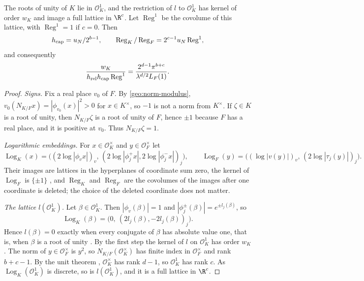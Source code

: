\begin{proposition}\label{geo:mass}
The roots of unity of $K$ lie in $\mathcal O_K^1$, and the restriction of
$l$ to $\mathcal O_K^1$ has kernel of order $w_K$ and image a full
lattice in $\R^c$. Let $\operatorname{Reg}^1$ be the covolume of this
lattice, with $\operatorname{Reg}^1=1$ if $c=0$. Then
\[
 h_{\rm cap}=u_N/2^{b-1},\qquad
 \operatorname{Reg}_K/\operatorname{Reg}_F=2^{c-1}u_N\operatorname{Reg}^1,
\]
and consequently
\begin{equation}\label{geo:mass-density}
 \frac{w_K}{h_{\rm rel}h_{\rm cap}\operatorname{Reg}^1}
 =\frac{2^{d-1}\pi^{b+c}}{\lambda^{d/2}L_F(1)}.
\end{equation}
\end{proposition}

\begin{proof}
\emph{Signs.} Fix a real place $v_0$ of $F$. By
\eqref{geo:norm-modulus}, $v_0(N_{K/F}x)=|\phi_{v_0}(x)|^2>0$ for
$x\in K^\times$, so $-1$ is not a norm from $K^\times$. If $\zeta\in K$
is a root of unity, then $N_{K/F}\zeta$ is a root of unity of $F$,
hence $\pm1$ because $F$ has a real place, and it is positive at $v_0$.
Thus $N_{K/F}\zeta=1$.

\emph{Logarithmic embeddings.} For $x\in\mathcal O_K^\times$ and
$y\in\mathcal O_F^\times$ let
\[
 \operatorname{Log}_K(x)=\bigl((2\log|\phi_vx|)_v,\,(2\log|\phi_j^+x|,
 2\log|\phi_j^-x|)_j\bigr),\qquad
 \operatorname{Log}_F(y)=\bigl((\log|v(y)|)_v,\,(2\log|\tau_j(y)|)_j\bigr).
\]
Their images are lattices in the hyperplanes of coordinate sum zero,
the kernel of $\operatorname{Log}_F$ is $\{\pm1\}$
\cite[Proposition~5.8]{MilneANT}, and $\operatorname{Reg}_K$ and
$\operatorname{Reg}_F$ are the covolumes of the images after one
coordinate is deleted; the choice of the deleted coordinate does not
matter.

\emph{The lattice $l(\mathcal O_K^1)$.} Let $\beta\in\mathcal O_K^1$. Then
$|\phi_v(\beta)|=1$ and $|\phi_j^\pm(\beta)|=e^{\pm l_j(\beta)}$, so
\[
 \operatorname{Log}_K(\beta)=\bigl(0,\ (2l_j(\beta),-2l_j(\beta))_j\bigr).
\]
Hence $l(\beta)=0$ exactly when every conjugate of $\beta$ has absolute
value one, that is, when $\beta$ is a root of unity
\cite[Corollary~5.6]{MilneANT}. By the first step the kernel of $l$ on
$\mathcal O_K^1$ has order $w_K$. The norm of $y\in\mathcal O_F^\times$
is $y^2$, so $N_{K/F}(\mathcal O_K^\times)$ has finite index in
$\mathcal O_F^\times$ and rank $b+c-1$. By the unit theorem
\cite[Theorem~5.1]{MilneANT}, $\mathcal O_K^\times$ has rank $d-1$, so
$\mathcal O_K^1$ has rank $c$. As $\operatorname{Log}_K(\mathcal O_K^1)$
is discrete, so is $l(\mathcal O_K^1)$, and it is a full lattice in
$\R^c$.


\end{proof}
